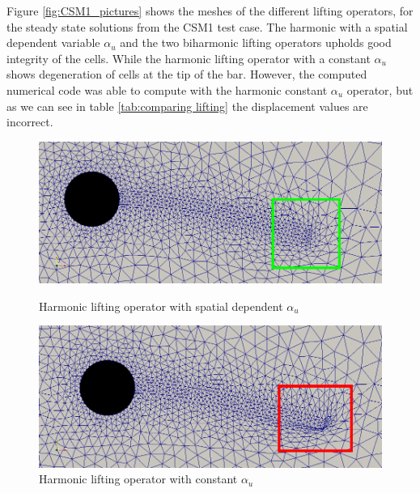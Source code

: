 Figure \ref{fig:CSM1_pictures} shows the meshes of the different lifting operators, for the steady state solutions from the CSM1 test case. The harmonic with a spatial dependent variable $\alpha_u$ and the two biharmonic lifting operators upholds good integrity of the cells. While the harmonic lifting operator with a constant $\alpha_u$ shows degeneration of cells at the tip of the bar. However, the computed numerical code was able to compute with the harmonic constant $\alpha_u$ operator, but as we can see in table \ref{tab:comparing lifting} the displacement values are incorrect.

\begin{figure}[H]  
  \begin{minipage}[b]{0.6\linewidth}
    \centering
    \includegraphics[scale=0.25]{./Mesh_motion_results/CSM1_laplace_rectangle.png} 
    \caption{Harmonic lifting operator with spatial dependent $\alpha_u$} 
    \vspace{4ex}
  \end{minipage}%
  \begin{minipage}[b]{0.6\linewidth}
    \centering
    \includegraphics[scale=0.25]{./Mesh_motion_results/CSM1_constant_rectangle.png} 
    \caption{Harmonic lifting operator with constant $\alpha_u$} 
    \vspace{4ex}
  \end{minipage} 
  \begin{minipage}[b]{0.6\linewidth}
    \centering

\end{minipage}
\end{figure}
